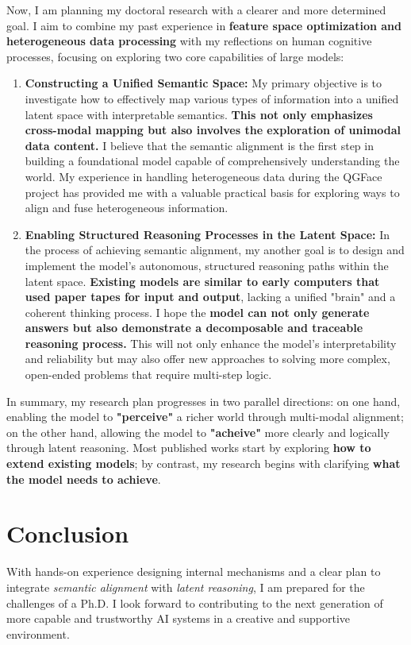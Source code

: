 \documentclass[11pt, letterpaper]{article}
\renewcommand{\emph}[1]{{\fontfamily{ppl}\itshape #1}}
\let\oldtextbf\textbf
\renewcommand{\textbf}[1]{{\color{black}\oldtextbf{#1}}}
\begin{document}
Now, I am planning my doctoral research with a clearer and more determined goal. I aim to combine my past experience in \textbf{feature space optimization and heterogeneous data processing} with my reflections on human cognitive processes, focusing on exploring two core capabilities of large models:
\begin{enumerate}
    \item \textbf{Constructing a Unified Semantic Space:} My primary objective is to investigate how to effectively map various types of information into a unified latent space with interpretable semantics. \textbf{This not only emphasizes cross-modal mapping but also involves the exploration of unimodal data content.} I believe that the semantic alignment is the first step in building a foundational model capable of comprehensively understanding the world. My experience in handling heterogeneous data during the QGFace project has provided me with a valuable practical basis for exploring ways to align and fuse heterogeneous information.
    \item \textbf{Enabling Structured Reasoning Processes in the Latent Space:} In the process of achieving semantic alignment, my another goal is to design and implement the model's autonomous, structured reasoning paths within the latent space. \textbf{Existing models are similar to early computers that used paper tapes for input and output}, lacking a unified "brain" and a coherent thinking process. I hope the \textbf{model can not only generate answers but also demonstrate a decomposable and traceable reasoning process.}  This will not only enhance the model's interpretability and reliability but may also offer new approaches to solving more complex, open-ended problems that require multi-step logic.
\end{enumerate}

In summary, my research plan progresses in two parallel directions: on one hand, enabling the model to \textbf{"perceive"} a richer world through multi-modal alignment; on the other hand, allowing the model to \textbf{"acheive"} more clearly and logically through latent reasoning. Most published works start by exploring \textbf{how to extend existing models}; by contrast, my research begins with clarifying \textbf{what the model needs to achieve}.

\section{Conclusion}

With hands-on experience designing internal mechanisms and a clear plan to integrate \emph{semantic alignment} with \emph{latent reasoning}, I am prepared for the challenges of a Ph.D. I look forward to contributing to the next generation of more capable and trustworthy AI systems in a creative and supportive environment.



\end{document}
